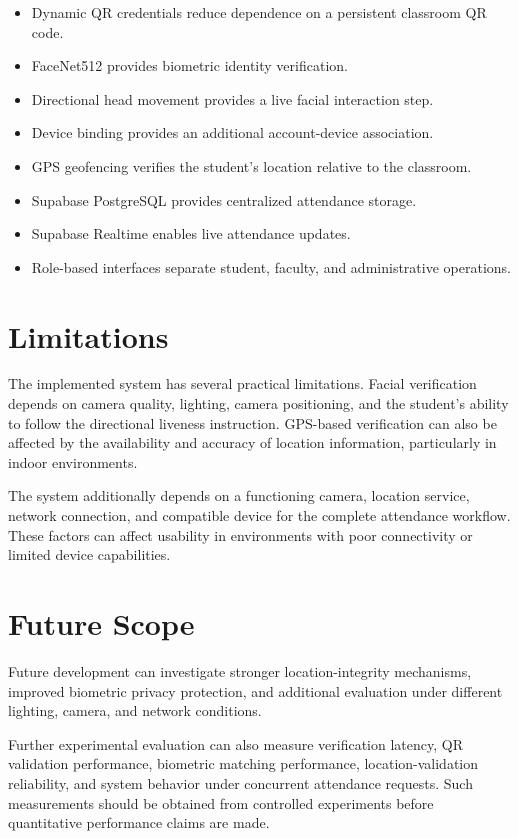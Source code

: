 \documentclass[conference]{IEEEtran}
\begin{document}
\begin{itemize}
    \item Dynamic QR credentials reduce dependence on a persistent classroom QR code.
    \item FaceNet512 provides biometric identity verification.
    \item Directional head movement provides a live facial interaction step.
    \item Device binding provides an additional account-device association.
    \item GPS geofencing verifies the student's location relative to the classroom.
    \item Supabase PostgreSQL provides centralized attendance storage.
    \item Supabase Realtime enables live attendance updates.
    \item Role-based interfaces separate student, faculty, and administrative operations.
\end{itemize}


\section{Limitations}

The implemented system has several practical limitations. Facial verification depends on camera quality, lighting, camera positioning, and the student's ability to follow the directional liveness instruction. GPS-based verification can also be affected by the availability and accuracy of location information, particularly in indoor environments.

The system additionally depends on a functioning camera, location service, network connection, and compatible device for the complete attendance workflow. These factors can affect usability in environments with poor connectivity or limited device capabilities.


\section{Future Scope}

Future development can investigate stronger location-integrity mechanisms, improved biometric privacy protection, and additional evaluation under different lighting, camera, and network conditions.

Further experimental evaluation can also measure verification latency, QR validation performance, biometric matching performance, location-validation reliability, and system behavior under concurrent attendance requests. Such measurements should be obtained from controlled experiments before quantitative performance claims are made.
\end{document}
